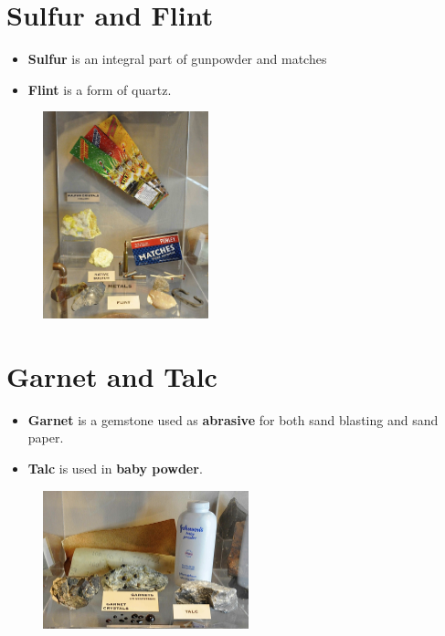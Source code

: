 \documentclass[12pt, letterpaper]{article}
\begin{document}
\pagebreak

\section{Sulfur and Flint}

	\begin{itemize}
		\item \textbf{Sulfur} is an integral part of gunpowder and matches
		\item \textbf{Flint} is a form of quartz.
	\end{itemize}
	
	\begin{figure}[h]
		\includegraphics[height=6cm]{shelf04}
		\centering
	\end{figure}

\section{Garnet and Talc}

	\begin{itemize}
		\item \textbf{Garnet} is a gemstone used as \textbf{abrasive} for both sand blasting and sand paper.
		\item \textbf {Talc} is used in \textbf{baby powder}.
	\end{itemize}
	
	\begin{figure}[h]
		\includegraphics[height=4cm]{shelf05_0}
		\centering
	\end{figure}
\end{document}
